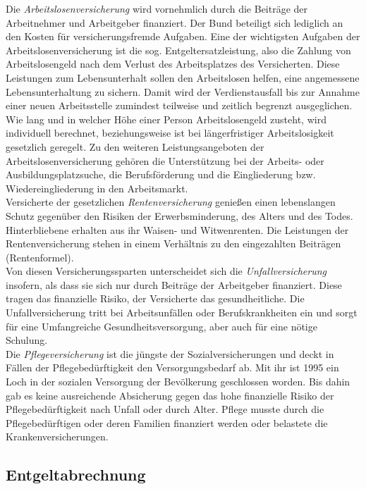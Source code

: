 \documentclass[a4paper, 12pt]{report}
\begin{document}
Die \emph{Arbeitslosenversicherung} wird vornehmlich durch die Beiträge der 
Arbeitnehmer und Arbeitgeber finanziert. Der Bund beteiligt sich lediglich an 
den Kosten für versicherungsfremde Aufgaben. Eine der wichtigsten Aufgaben der 
Arbeitslosenversicherung ist die sog. Entgeltersatzleistung, also die Zahlung 
von Arbeitslosengeld nach dem Verlust des Arbeitsplatzes des Versicherten. Diese
Leistungen zum Lebensunterhalt sollen den Arbeitslosen helfen, eine angemessene
Lebensunterhaltung zu sichern. Damit wird der Verdienstausfall bis zur Annahme 
einer neuen Arbeitsstelle zumindest teilweise und zeitlich begrenzt 
ausgeglichen. Wie lang und in welcher Höhe einer Person Arbeitslosengeld 
zusteht, wird individuell berechnet, beziehungsweise ist bei längerfristiger 
Arbeitslosigkeit gesetzlich geregelt. Zu den weiteren Leistungsangeboten der 
Arbeitslosenversicherung gehören die Unterstützung bei der Arbeits- oder 
Ausbildungsplatzsuche, die Berufsförderung und die Eingliederung bzw. 
Wiedereingliederung in den Arbeitsmarkt. \\

Versicherte der gesetzlichen \emph{Rentenversicherung} genießen einen 
lebenslangen Schutz gegenüber den Risiken der Erwerbsminderung, des Alters und 
des Todes. Hinterbliebene erhalten aus ihr Waisen- und Witwenrenten. Die 
Leistungen der Rentenversicherung stehen in einem Verhältnis zu den eingezahlten
Beiträgen (Rentenformel). \\

Von diesen Versicherungssparten unterscheidet sich die \emph{Unfallversicherung}
insofern, als dass sie sich nur durch Beiträge der Arbeitgeber finanziert. Diese 
tragen das finanzielle Risiko, der Versicherte das gesundheitliche. Die 
Unfallversicherung tritt bei Arbeitsunfällen oder Berufskrankheiten ein und 
sorgt für eine Umfangreiche Gesundheitsversorgung, aber auch für eine nötige
Schulung. \\

Die \emph{Pflegeversicherung} ist die jüngste der Sozialversicherungen und deckt
in Fällen der Pflegebedürftigkeit den Versorgungsbedarf ab. Mit ihr ist 1995 ein
Loch in der sozialen Versorgung der Bevölkerung geschlossen worden. Bis dahin 
gab es keine ausreichende Absicherung gegen das hohe finanzielle Risiko der 
Pflegebedürftigkeit nach Unfall oder durch Alter. Pflege musste durch die 
Pflegebedürftigen oder deren Familien finanziert werden oder belastete die 
Krankenversicherungen. 

\subsection{Entgeltabrechnung}
\end{document}
